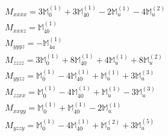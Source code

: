\documentclass[fleqn,8pt,landscape]{jsarticle}
\begin{document}
\begin{align*}
& M_{xxxx} = 3 \mathbb{M}_{0}^{(1)} + 3 \mathbb{M}_{40}^{(1)} - 2 \mathbb{M}_{u}^{(1)} - 4 \mathbb{M}_{u}^{(2)} \\
& M_{xxxz} = \mathbb{M}_{4b}^{(1)} \\
& M_{yyyz} = - \mathbb{M}_{4a}^{(1)} \\
& M_{zzzz} = 3 \mathbb{M}_{0}^{(1)} + 8 \mathbb{M}_{40}^{(1)} + 4 \mathbb{M}_{u}^{(1)} + 8 \mathbb{M}_{u}^{(2)} \\
& M_{yyzz} = \mathbb{M}_{0}^{(1)} - 4 \mathbb{M}_{40}^{(1)} + \mathbb{M}_{u}^{(1)} + 3 \mathbb{M}_{u}^{(3)} \\
& M_{zzxx} = \mathbb{M}_{0}^{(1)} - 4 \mathbb{M}_{40}^{(1)} + \mathbb{M}_{u}^{(1)} - 3 \mathbb{M}_{u}^{(3)} \\
& M_{xxyy} = \mathbb{M}_{0}^{(1)} + \mathbb{M}_{40}^{(1)} - 2 \mathbb{M}_{u}^{(1)} \\
& M_{yzzy} = \mathbb{M}_{0}^{(1)} - 4 \mathbb{M}_{40}^{(1)} + \mathbb{M}_{u}^{(2)} + 3 \mathbb{M}_{u}^{(5)}
\end{align*}
\end{document}
